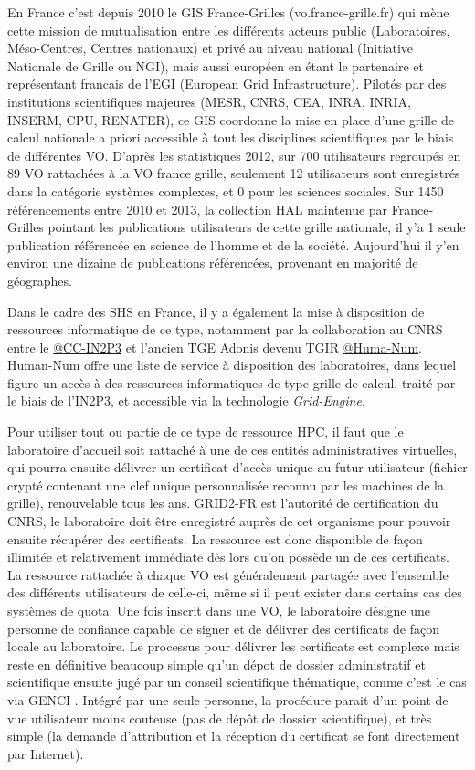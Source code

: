 En France c'est depuis 2010 le GIS France-Grilles (vo.france-grille.fr) qui mène cette mission de mutualisation entre les différents acteurs public (Laboratoires, Méso-Centres, Centres nationaux) et privé au niveau national (Initiative Nationale de Grille ou NGI), mais aussi européen en étant le partenaire et représentant francais de l'EGI (European Grid Infrastructure). Pilotés par des institutions scientifiques majeures (MESR, CNRS, CEA, INRA, INRIA, INSERM, CPU, RENATER), ce GIS coordonne la mise en place d'une grille de calcul nationale a priori accessible à tout les disciplines scientifiques par le biais de différentes VO. D'après les statistiques 2012, sur 700 utilisateurs regroupés en 89 VO rattachées à la VO france grille, seulement 12 utilisateurs sont enregistrés dans la catégorie systèmes complexes, et 0 pour les sciences sociales. Sur 1450 référencements entre 2010 et 2013, la collection HAL maintenue par France-Grilles pointant les publications utilisateurs de cette grille nationale, il y'a 1 seule publication référencée en science de l'homme et de la société. Aujourd'hui il y'en environ une dizaine de publications référencées, provenant en majorité de géographes.

Dans le cadre des SHS en France, il y a également la mise à disposition de ressources informatique de ce type, notamment par la collaboration au CNRS entre le \href{http://cc.in2p3.fr/}{@CC-IN2P3} et l'ancien TGE Adonis devenu TGIR \href{http://www.huma-num.fr/}{@Huma-Num}. Human-Num offre une liste de service à disposition des laboratoires, dans lequel figure un accès à des ressources informatiques de type grille de calcul, traité par le biais de l'IN2P3, et accessible via la technologie \textit{Grid-Engine}.

Pour utiliser tout ou partie de ce type de ressource HPC, il faut que le laboratoire d'accueil soit rattaché à une de ces entités administratives virtuelles, qui pourra ensuite délivrer un certificat d'accès unique au futur utilisateur (fichier crypté contenant une clef unique personnalisée reconnu par les machines de la grille), renouvelable tous les ans. GRID2-FR est l'autorité de certification du CNRS, le laboratoire doit être enregistré auprès de cet organisme pour pouvoir ensuite récupérer des certificats. La ressource est donc disponible de façon illimitée et relativement immédiate dès lors qu'on possède un de ces certificats. La ressource rattachée à chaque VO est généralement partagée avec l'ensemble des différents utilisateurs de celle-ci, même si il peut exister dans certains cas des systèmes de quota. Une fois inscrit dans une VO, le laboratoire désigne une personne de confiance capable de signer et de délivrer des certificats de façon locale au laboratoire. Le processus pour délivrer les certificats est complexe mais reste en définitive beaucoup simple qu'un dépot de dossier administratif et scientifique ensuite jugé par un conseil scientifique thématique, comme c'est le cas via GENCI \autocites{GENCI2014,GENCI2015}. Intégré par une seule personne, la procédure parait d'un point de vue utilisateur moins couteuse (pas de dépôt de dossier scientifique), et très simple (la demande d'attribution et la réception du certificat se font directement par Internet).

